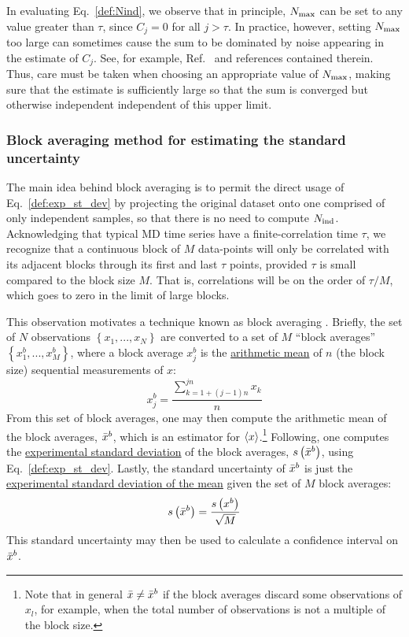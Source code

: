 In evaluating Eq.~\eqref{def:Nind}, we observe that in principle, $N_{\rm max}$ can be set to any value greater than $\tau$, since $C_j=0$ for all $j > \tau$.  In practice, however, setting $N_{\rm max}$ too large can sometimes cause the sum to be dominated by noise appearing in the estimate of $C_j$.  See, for example, Ref.~\cite{acfnoise} and references contained therein.  Thus, care must be taken when choosing an appropriate value of $N_{\rm max}$, making sure that the estimate is sufficiently large so that the sum is converged but otherwise independent independent of this upper limit.  

\subsubsection{Block averaging method for estimating the standard uncertainty}\label{sec:blockavg}

The main idea behind block averaging is to permit the direct usage of Eq.~\ref{def:exp_st_dev} by projecting the original dataset onto one comprised of only independent samples, so that there is no need to compute $N_{\rm ind}$.  Acknowledging that typical MD time series have a finite-correlation time $\tau$, we recognize that a continuous block of $M$ data-points will only be correlated with its adjacent blocks through its first and last $\tau$ points, provided $\tau$ is small compared to the block size $M$.   That is, correlations will be on the order of $\tau / M$, which goes to zero in the limit of large blocks.

This observation motivates a technique known as block averaging \cite{Friedberg1970,Flyvbjerg-1989,FrenkelSmit2002,Grossfield2009}.
Briefly, the set of $N$ observations $\left\{x_1, ..., x_N\right\}$ are converted to a set of $M$ ``block averages'' $\left\{x^b_1, ..., x^b_{M}\right\}$, where a block average $x^b_j$ is the \hyperref[def:arith_mean]{arithmetic mean} of $n$ (the block size) sequential measurements of $x$:
%
\begin{equation}
  x^b_j = \dfrac{\sum\limits_{k=1+(j-1)n}^{jn} x_k}{n}
\end{equation}
%
From this set of block averages, one may then compute the arithmetic mean of the block averages, $\bar{x}^b$, which is an estimator for $\langle x \rangle$.\footnote{Note that in general $\bar{x} \ne \bar{x}^b$ if the block averages discard some observations of $x_l$, for example, when the total number of observations is not a multiple of the block size.}
Following, one computes the \hyperref[def:exp_st_dev]{experimental standard deviation} of the block averages, $s\left( \bar{x}^b \right)$, using Eq.~\ref{def:exp_st_dev}.
Lastly, the standard uncertainty of $\bar{x}^b$ is just the \hyperref[def:exp_st_dev_mean]{experimental standard deviation of the mean} given the set of $M$ block averages:
%
\begin{equation}
  s\left( \bar{x}^b \right) = \dfrac{s\left( x^b \right)}{\sqrt{M}}
\end{equation}
%
This standard uncertainty may then be used to calculate a confidence interval on $\bar{x}^b$.

